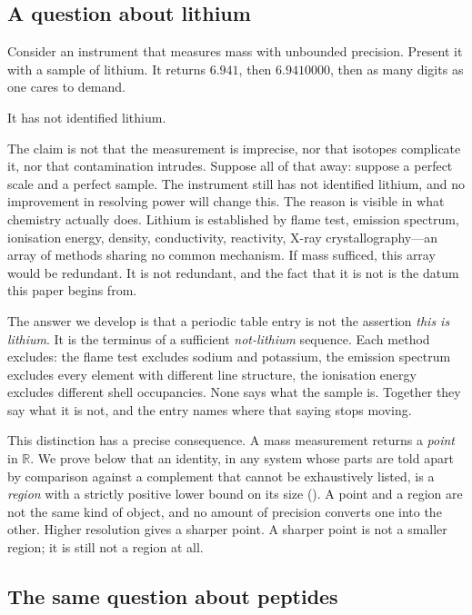 \documentclass[11pt,a4paper]{article}
\theoremstyle{definition}
\theoremstyle{remark}
\begin{document}
\subsection{A question about lithium}
\label{sec:lithium}

Consider an instrument that measures mass with unbounded precision.
Present it with a sample of lithium. It returns $6.941$, then
$6.9410000$, then as many digits as one cares to demand.

It has not identified lithium.

The claim is not that the measurement is imprecise, nor that isotopes
complicate it, nor that contamination intrudes. Suppose all of that away:
suppose a perfect scale and a perfect sample. The instrument still has
not identified lithium, and no improvement in resolving power will change
this. The reason is visible in what chemistry actually does. Lithium is
established by flame test, emission spectrum, ionisation energy, density,
conductivity, reactivity, X-ray crystallography---an array of methods
sharing no common mechanism. If mass sufficed, this array would be
redundant. It is not redundant, and the fact that it is not is the datum
this paper begins from.

The answer we develop is that a periodic table entry is not the assertion
\emph{this is lithium}. It is the terminus of a sufficient
\emph{not-lithium} sequence. Each method excludes: the flame test
excludes sodium and potassium, the emission spectrum excludes every
element with different line structure, the ionisation energy excludes
different shell occupancies. None says what the sample is. Together they
say what it is not, and the entry names where that saying stops moving.

This distinction has a precise consequence. A mass measurement returns a
\emph{point} in $\mathbb{R}$. We prove below that an identity, in any
system whose parts are told apart by comparison against a complement that
cannot be exhaustively listed, is a \emph{region} with a strictly
positive lower bound on its size (). A point and a
region are not the same kind of object, and no amount of precision
converts one into the other. Higher resolution gives a sharper point. A
sharper point is not a smaller region; it is still not a region at all.

\subsection{The same question about peptides}
\end{document}
